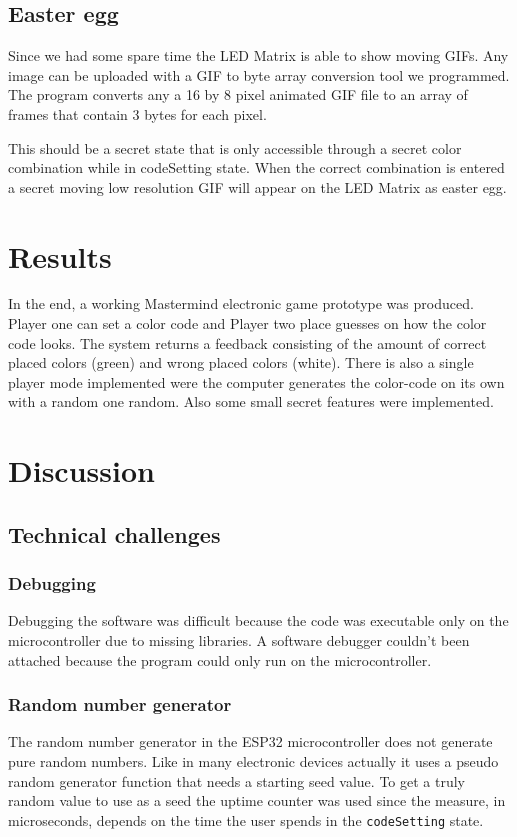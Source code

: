 \documentclass[a4paper, 12pt]{article}
\begin{document}
\subsection{Easter egg}
Since we had some spare time the LED Matrix is able to show moving GIFs.
Any image can be uploaded with a GIF to byte array conversion tool we
programmed. The program converts any a 16 by 8 pixel animated GIF file
to an array of frames that contain 3 bytes for each pixel.

This should be a secret state that is only accessible through a secret
color combination while in codeSetting state. When the correct
combination is entered a secret moving low resolution GIF will appear on
the LED Matrix as easter egg.

\section{Results}
In the end, a working Mastermind electronic game prototype was produced.
Player one can set a color code and Player two place guesses on how the
color code looks. The system returns a feedback consisting of the amount
of correct placed colors (green) and wrong placed colors (white). There
is also a single player mode implemented were the computer generates the
color-code on its own with a random one random. Also some small secret
features were implemented. 

\section{Discussion}
\subsection{Technical challenges}
\subsubsection{Debugging}
Debugging the software was difficult because the code was executable
only on the microcontroller due to missing libraries. A software
debugger couldn’t been attached because the program could only run on
the microcontroller. 

\subsubsection{Random number generator}
The random number generator in the ESP32 microcontroller does not
generate pure random numbers. Like in many electronic devices actually
it uses a pseudo random generator function that needs a starting seed
value. To get a truly random value to use as a seed the uptime counter
was used since the measure, in microseconds, depends on the time the
user spends in the {\tt codeSetting} state.
\end{document}
